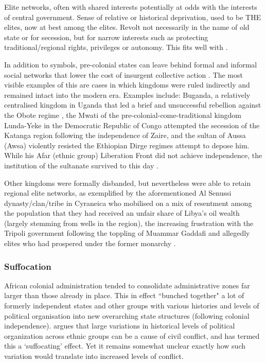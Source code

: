 \documentclass[12pt]{article}
\begin{document}
\begin{multicols}{2}
Elite networks, often with shared interests potentially at odds with the
interests of central government. Sense of relative or historical deprivation,
used to be THE elites, now at best among the elites. Revolt not necessarily in
the name of old state or for secession, but for narrow interests such as
protecting traditional/regional rights, privileges or autonomy. This fits well
with \citet{Ying_2020}.

In addition to symbols, pre-colonial states can leave behind formal and informal
social networks that lower the cost of insurgent collective action
\citep{Wig2016, Wood2000}. The most visible examples of this are cases in which
kingdoms were ruled indirectly and remained intact into the modern era. Examples
include: Buganda, a relatively centralised kingdom in Uganda that led a brief
and unsuccessful rebellion against the Obote regime \citep{Tuck2005}, the Mwati
of the pre-colonial-come-traditional kingdom Lunda-Yeke in the Democratic
Republic of Congo attempted the secession of the Katanga region following the
independence of Zaire, and the sultan of Aussa (Awsa) violently resisted the
Ethiopian Dirge regimes attempt to depose him. While his Afar (ethnic group)
Liberation Front did not achieve independence, the institution of the sultanate
survived to this day \citep{Shehim1985, Hanfare2011}.

Other kingdoms were formally disbanded, but nevertheless were able to retain
regional elite networks, as exemplified by the aforementioned Al Senussi
dynasty/clan/tribe in Cyraneica who mobilised on a mix of resentment among the
population that they had received an unfair share of Libya's oil wealth (largely
stemming from wells in the region), the increasing frustration with the
Tripoli government following the toppling of Muammar Gaddafi and allegedly
elites who had prospered under the former monarchy \citep{Fetouri2012}.

\subsubsection{Suffocation}

African colonial administration tended to consolidate administrative zones far
larger than those already in place. This in effect ``bunched together" a lot of
formerly independent states and other groups with various histories and levels
of political organisation into new overarching state structures (following
colonial independence). \citet{Englebert2002} argues that large variations in
historical levels of political organization across ethnic groups can be a cause
of civil conflict, and has termed this a `suffocating' effect. Yet it remains
somewhat unclear exactly how such variation would translate into increased
levels of conflict. 


\end{multicols}
\end{document}
